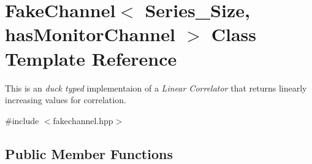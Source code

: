 \hypertarget{classFakeChannel}{}\section{Fake\+Channel$<$ Series\+\_\+\+Size, has\+Monitor\+Channel $>$ Class Template Reference}
\label{classFakeChannel}


This is an {\itshape duck typed} implementaion of a {\itshape Linear Correlator} that returns linearly increasing values for correlation.  




{\ttfamily \#include $<$fakechannel.\+hpp$>$}

\subsection*{Public Member Functions}
